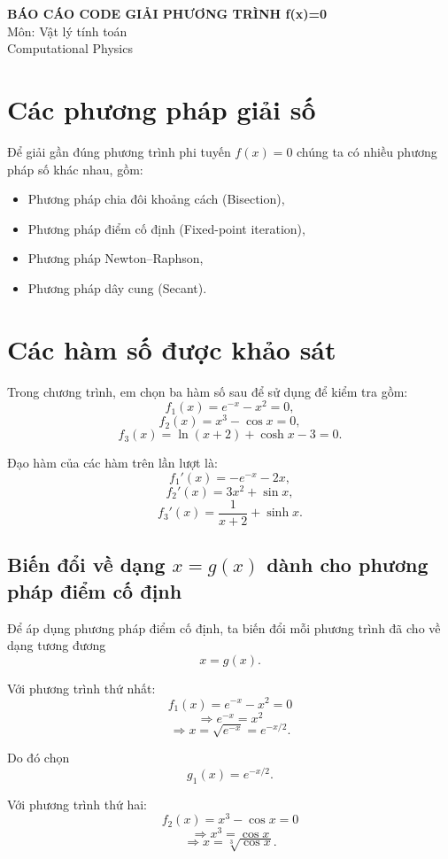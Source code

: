 \documentclass{article}
\begin{document}
\begin{center}
    {\LARGE \textbf{BÁO CÁO CODE GIẢI PHƯƠNG TRÌNH f(x)=0}}\\[0.5em]
    {\large Môn: Vật lý tính toán\\[0.5em]Computational Physics}
\end{center}

\vspace{1em}

\section{Các phương pháp giải số}

Để giải gần đúng phương trình phi tuyến \(f(x)=0\) chúng ta có nhiều phương pháp số khác nhau, gồm:
\begin{itemize}
    \item Phương pháp chia đôi khoảng cách (Bisection),
    \item Phương pháp điểm cố định (Fixed-point iteration),
    \item Phương pháp Newton--Raphson,
    \item Phương pháp dây cung (Secant).
\end{itemize}

\section{Các hàm số được khảo sát}

Trong chương trình, em chọn ba hàm số sau để sử dụng để kiểm tra gồm:
\[
f_1(x)=e^{-x}-x^2 = 0,
\]
\[
f_2(x)=x^3-\cos x = 0,
\]
\[
f_3(x)=\ln(x+2)+\cosh x-3 = 0.
\]

Đạo hàm của các hàm trên lần lượt là:
\[
f_1'(x)=-e^{-x}-2x,
\]
\[
f_2'(x)=3x^2+\sin x,
\]
\[
f_3'(x)=\frac{1}{x+2}+\sinh x.
\]

\subsection{Biến đổi về dạng \(x=g(x)\) dành cho phương pháp điểm cố định}

Để áp dụng phương pháp điểm cố định, ta biến đổi mỗi phương trình đã cho về dạng tương đương
\[
x=g(x).
\]

Với phương trình thứ nhất:
\[
f_1(x)=e^{-x}-x^2=0
\]
\[
\Rightarrow e^{-x}=x^2
\]
\[
\Rightarrow x=\sqrt{e^{-x}}=e^{-x/2}.
\]

Do đó chọn
\[
g_1(x)=e^{-x/2}.
\]

Với phương trình thứ hai:
\[
f_2(x)=x^3-\cos x=0
\]
\[
\Rightarrow x^3=\cos x
\]
\[
\Rightarrow x=\sqrt[3]{\cos x}.
\]
\end{document}

